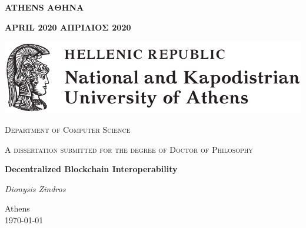   \vfill
  \begin{center}
  {\bfseries
    \ifenglishfrontpage
    ATHENS
    \else
  ΑΘΗΝΑ
    \fi
  }
  \linebreak

  {\bfseries
    \ifenglishfrontpage
    APRIL 2020
    \else
    ΑΠΡΙΛΙΟΣ 2020
    \fi
    }
  \end{center}
  \clearpage

  \newpage\null\newpage
\else
 \begin{titlepage}
   \centering
   \includegraphics[width=\textwidth]{chapters/preface/figures/uoa.pdf}\par\vspace{1cm}
   {\scshape\Large Department of Computer Science\par}
   \vspace{1cm}
   {\scshape A dissertation submitted for the degree of Doctor of Philosophy\par}
   \vspace{1cm}
   {\huge\bfseries Decentralized Blockchain Interoperability\par}
   \vspace{2cm}
   {\Large\itshape Dionysis
                   Zindros\par}
 	\vfill
 	{\large Athens\\\today\par}
 \end{titlepage}
 \newpage\null\thispagestyle{empty}\newpage
\fi
